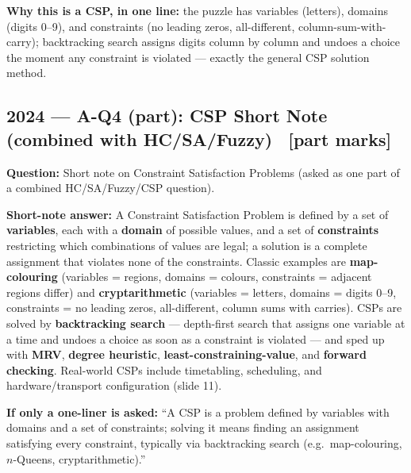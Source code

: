 \documentclass[12pt, a4paper]{article}
\newenvironment{solutionbox}{\begin{mdframed}[style=solutionframe]}{\end{mdframed}}
\newenvironment{answerbox}{\begin{mdframed}[style=answerframe]}{\end{mdframed}}
\begin{document}
\begin{answerbox}
\textbf{Why this is a CSP, in one line:} the puzzle has variables (letters), domains (digits 0--9), and constraints (no leading zeros, all-different, column-sum-with-carry); backtracking search assigns digits column by column and undoes a choice the moment any constraint is violated — exactly the general CSP solution method.
\end{answerbox}

\subsection{2024 — A-Q4 (part): CSP Short Note (combined with HC/SA/Fuzzy) \ [part marks]}

\begin{solutionbox}
\textbf{Question:} Short note on Constraint Satisfaction Problems (asked as one part of a combined HC/SA/Fuzzy/CSP question).
\end{solutionbox}

\noindent\textbf{Short-note answer:} A Constraint Satisfaction Problem is defined by a set of \textbf{variables}, each with a \textbf{domain} of possible values, and a set of \textbf{constraints} restricting which combinations of values are legal; a solution is a complete assignment that violates none of the constraints. Classic examples are \textbf{map-colouring} (variables = regions, domains = colours, constraints = adjacent regions differ) and \textbf{cryptarithmetic} (variables = letters, domains = digits 0--9, constraints = no leading zeros, all-different, column sums with carries). CSPs are solved by \textbf{backtracking search} — depth-first search that assigns one variable at a time and undoes a choice as soon as a constraint is violated — and sped up with \textbf{MRV}, \textbf{degree heuristic}, \textbf{least-constraining-value}, and \textbf{forward checking}. Real-world CSPs include timetabling, scheduling, and hardware/transport configuration (slide 11).

\begin{answerbox}
\textbf{If only a one-liner is asked:} ``A CSP is a problem defined by variables with domains and a set of constraints; solving it means finding an assignment satisfying every constraint, typically via backtracking search (e.g.\ map-colouring, $n$-Queens, cryptarithmetic).''
\end{answerbox}
\end{document}
